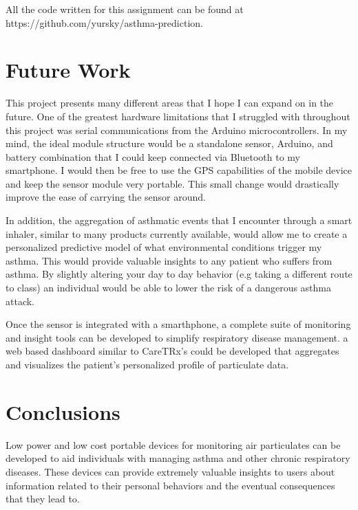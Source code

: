 \documentclass{sigchi}
\begin{document}
All the code written for this assignment can be found at https://github.com/yursky/asthma-prediction.


\section{Future Work}

This project presents many different areas that I hope I can expand on in the future.
One of the greatest hardware limitations that I struggled with throughout this project
was serial communications from the Arduino microcontrollers. In my mind, the ideal
module structure would be a standalone sensor, Arduino, and battery combination that
I could keep connected via Bluetooth to my smartphone. I would then be free to use the
GPS capabilities of the mobile device and keep the sensor module very portable. This small
change would drastically improve the ease of carrying the sensor around.

In addition, the aggregation of asthmatic events that I encounter through a smart
inhaler, similar to many products currently available, would allow me to create a
personalized predictive model of what environmental conditions trigger my asthma.
This would provide valuable insights to any patient who suffers from asthma.
By slightly altering your day to day behavior (e.g taking a different route to class)
an individual would be able to lower the risk of a dangerous asthma attack.

Once the sensor is integrated with a smarthphone, a complete suite of monitoring
and insight tools can be developed to simplify respiratory disease management. a
web based dashboard similar to CareTRx's could be developed that aggregates and
visualizes the patient's personalized profile of particulate data. \cite{caretrx}

\section{Conclusions}

Low power and low cost portable devices for monitoring air particulates can be developed
to aid individuals with managing asthma and other chronic respiratory diseases.
These devices can provide extremely valuable insights to users about information
related to their personal behaviors and the eventual consequences that they lead to.




%
%
%
%
%

\balance{}



\end{document}
